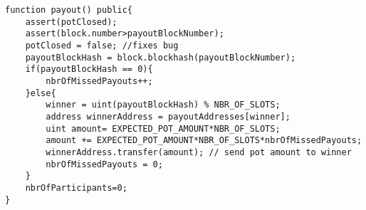 \begin{lstlisting}
function payout() public{
    assert(potClosed);
    assert(block.number>payoutBlockNumber);
    potClosed = false; //fixes bug
    payoutBlockHash = block.blockhash(payoutBlockNumber); 
    if(payoutBlockHash == 0){
        nbrOfMissedPayouts++;
    }else{
        winner = uint(payoutBlockHash) % NBR_OF_SLOTS;
        address winnerAddress = payoutAddresses[winner];
        uint amount= EXPECTED_POT_AMOUNT*NBR_OF_SLOTS;
        amount += EXPECTED_POT_AMOUNT*NBR_OF_SLOTS*nbrOfMissedPayouts;
        winnerAddress.transfer(amount); // send pot amount to winner
        nbrOfMissedPayouts = 0;
    }
    nbrOfParticipants=0;
}
\end{lstlisting}

